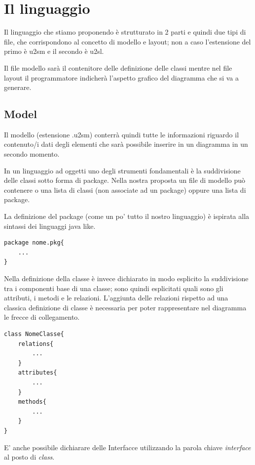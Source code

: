 \chapter{Il linguaggio}

Il linguaggio che stiamo proponendo è strutturato in 2 parti e quindi due tipi di
file, che corrispondono al concetto di modello e layout; non a caso l'estensione
del primo è u2sm e il secondo è u2sl.

Il file modello sarà il contenitore delle definizione delle classi mentre nel
file layout il programmatore indicherà l'aspetto grafico del diagramma che si va
a generare.


\section{Model}

Il modello (estensione .u2sm) conterrà quindi tutte le informazioni riguardo il
contenuto/i dati
degli elementi che sarà possibile inserire in un diagramma in un secondo
momento. 

In un linguaggio ad oggetti uno degli strumenti fondamentali è la suddivisione 
delle classi sotto forma di package. Nella nostra proposta un file di modello
può contenere o una lista di classi (non associate ad un package) oppure una
lista di package.

La definizione del package (come un po' tutto il nostro linguaggio) è 
ispirata alla sintassi dei linguaggi java like.

\begin{lstlisting}[caption={Dichiarazione di package}, style={model}]
package nome.pkg{
	...  	
}
\end{lstlisting}

Nella definizione della classe è invece dichiarato in modo esplicito la
suddivisione tra i componenti base di una classe; sono quindi esplicitati quali
sono gli attributi, i metodi e le relazioni. L'aggiunta delle relazioni rispetto
ad una classica definizione di classe è necessaria per poter rappresentare nel
diagramma le frecce di collegamento.


\begin{lstlisting}[caption={Dichiarazione di classe}, style={model}]
class NomeClasse{
	relations{
		...
	}
	attributes{
		...
	}
	methods{
		...
	}
}
\end{lstlisting}

E' anche possibile dichiarare delle Interfacce utilizzando la parola chiave
\emph{interface} al posto di \emph{class}. 

